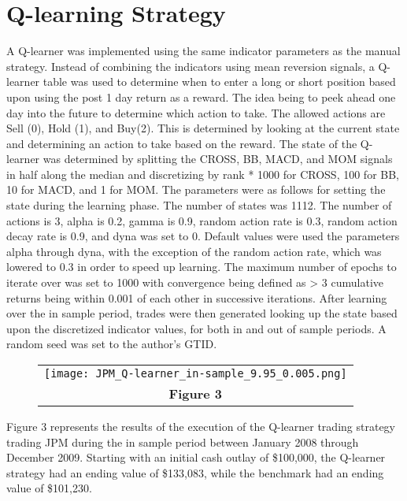 \documentclass[
	letterpaper, %
]{jdf}
\begin{document}
\section{Q-learning Strategy}

A Q-learner was implemented using the same indicator parameters as the manual strategy.  Instead of combining the indicators using mean reversion signals, a Q-learner table was used to determine when to enter a long or short position based upon using the post 1 day return as a reward. The idea being to peek ahead one day into the future to determine which action to take.  The allowed actions are Sell (0), Hold (1), and Buy(2).  This is determined by looking at the current state and determining an action to take based on the reward.  The state of the Q-learner was determined by splitting the CROSS, BB, MACD, and MOM signals in half along the median and discretizing by rank * 1000 for CROSS, 100 for BB, 10 for MACD, and 1 for MOM.  The parameters were as follows for setting the state during the learning phase. The number of states was 1112. The number of actions is 3, alpha is 0.2, gamma is 0.9, random action rate is 0.3, random action decay rate is 0.9, and dyna was set to 0.  Default values were used the parameters alpha through dyna, with the exception of the random action rate, which was lowered to 0.3 in order to speed up learning.  The maximum number of epochs to iterate over was set to 1000 with convergence being defined as > 3 cumulative returns being within 0.001 of each other in successive iterations. After learning over the in sample period, trades were then generated looking up the state based upon the discretized indicator values, for both in and out of sample periods. A random seed was set to the author's GTID.

\begin{figure}[h]
	\begin{tabular}{c}
		\texttt{[image: JPM\_Q-learner\_in-sample\_9.95\_0.005.png]} \\
		\textbf{Figure 3} \\
	\end{tabular}
\end{figure}

Figure 3 represents the results of the execution of the Q-learner trading strategy trading JPM during the in sample period between January 2008 through December 2009.  Starting with an initial cash outlay of \$100,000, the Q-learner strategy had an ending value of \$133,083, while the benchmark had an ending value of \$101,230.
\end{document}

